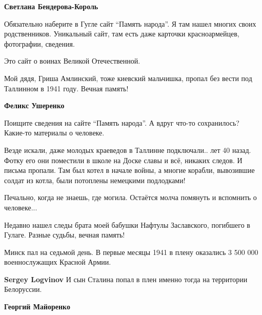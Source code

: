 \begin{itemize}
\begin{itemize} %
\textbf{Светлана Бендерова-Король} 

Обязательно наберите в Гугле сайт \enquote{Память народа}. Я там нашел многих своих
родственников. Уникальный сайт, там есть даже карточки красноармейцев,
фотографии, сведения.


Это сайт о воинах Великой Отечественной.


Мой дядя, Гриша Амлинский, тоже киевский мальчишка, пропал без вести под
Таллинном в 1941 году. Вечная память!

\begin{itemize} %
\textbf{Феликс Ушеренко} 

Поищите сведения на сайте \enquote{Память народа}. А вдруг что-то сохранилось? Какие-то
материалы о человеке.


Везде искали, даже молодых краеведов в Таллинне подключали.. лет 40 назад.
Фотку его они поместили в школе на Доске славы и всё, никаких следов. И письма
пропали. Там был котел в начале войны, а многие корабли, вывозившие солдат из
котла, были потоплены немецкими подлодками!

\end{itemize} %


Печально, когда не знаешь, где могила. Остаётся молча помянуть и вспомнить о
человеке...

\end{itemize} %


Недавно нашел следы брата моей бабушки Нафтулы Заславского, погибшего в Гулаге.
Разные судьбы, вечная память!


Минск пал на седьмой день. В первые месяцы 1941 в плену оказались 3 500 000
военнослужащих Красной Армии.

\begin{itemize} %
\textbf{Sergey Logvinov} И сын Сталина попал в плен именно тогда на территории Белоруссии.

\begin{itemize} %
\textbf{Георгий Майоренко} 


\end{itemize}
\end{itemize}
\end{itemize}
